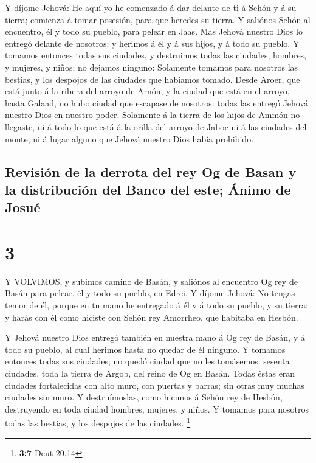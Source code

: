  Y díjome Jehová: He aquí yo he comenzado á dar delante de
ti á Sehón y á su tierra; comienza á tomar posesión, para que heredes su
tierra.  Y saliónos Sehón al encuentro, él y todo su
pueblo, para pelear en Jaas.  Mas Jehová nuestro Dios lo
entregó delante de nosotros; y herimos á él y á sus hijos, y á todo su
pueblo.  Y tomamos entonces todas sus ciudades, y
destruimos todas las ciudades, hombres, y mujeres, y niños; no dejamos
ninguno:  Solamente tomamos para nosotros las bestias, y
los despojos de las ciudades que habíamos tomado.  Desde
Aroer, que está junto á la ribera del arroyo de Arnón, y la ciudad que
está en el arroyo, hasta Galaad, no hubo ciudad que escapase de
nosotros: todas las entregó Jehová nuestro Dios en nuestro poder.
 Solamente á la tierra de los hijos de Ammón no llegaste,
ni á todo lo que está á la orilla del arroyo de Jaboc ni á las ciudades
del monte, ni á lugar alguno que Jehová nuestro Dios había prohibido.

\hypertarget{revisiuxf3n-de-la-derrota-del-rey-og-de-basan-y-la-distribuciuxf3n-del-banco-del-este-uxe1nimo-de-josuuxe9}{%
\subsection{Revisión de la derrota del rey Og de Basan y la distribución
del Banco del este; Ánimo de
Josué}\label{revisiuxf3n-de-la-derrota-del-rey-og-de-basan-y-la-distribuciuxf3n-del-banco-del-este-uxe1nimo-de-josuuxe9}}

\hypertarget{section-2}{%
\section{3}\label{section-2}}

 Y VOLVIMOS, y subimos camino de Basán, y saliónos al
encuentro Og rey de Basán para pelear, él y todo su pueblo, en Edrei.
 Y díjome Jehová: No tengas temor de él, porque en tu mano
he entregado á él y á todo su pueblo, y su tierra: y harás con él como
hiciste con Sehón rey Amorrheo, que habitaba en Hesbón.

 Y Jehová nuestro Dios entregó también en nuestra mano á Og
rey de Basán, y á todo su pueblo, al cual herimos hasta no quedar de él
ninguno.  Y tomamos entonces todas sus ciudades; no quedó
ciudad que no les tomásemos: sesenta ciudades, toda la tierra de Argob,
del reino de Og en Basán.  Todas éstas eran ciudades
fortalecidas con alto muro, con puertas y barras; sin otras muy muchas
ciudades sin muro.  Y destruímoslas, como hicimos á Sehón
rey de Hesbón, destruyendo en toda ciudad hombres, mujeres, y niños.
 Y tomamos para nosotros todas las bestias, y los despojos
de las ciudades. \footnote{\textbf{3:7} Deut 20,14}

